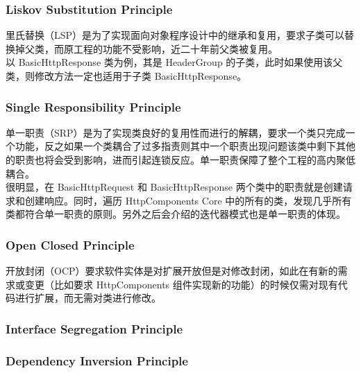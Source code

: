 \documentclass{article}
\begin{document}
	\subsubsection{Liskov Substitution Principle}
	\begin{CJK}{UTF8}{gbsn}
		\indent \indent 里氏替换（LSP）是为了实现面向对象程序设计中的继承和复用，要求子类可以替换掉父类，而原工程的功能不受影响，近二十年前父类被复用。\\
		\indent 以 BasicHttpResponse 类为例，其是 HeaderGroup 的子类，此时如果使用该父类，则修改方法一定也适用于子类 BasicHttpResponse。
	\end{CJK}{}

	\subsubsection{Single Responsibility Principle}
	\begin{CJK}{UTF8}{gbsn}
		\indent \indent 单一职责（SRP）是为了实现类良好的复用性而进行的解耦，要求一个类只完成一个功能，反之如果一个类耦合了过多指责则其中一个职责出现问题该类中剩下其他的职责也将会受到影响，进而引起连锁反应。单一职责保障了整个工程的高内聚低耦合。\\
		\indent 很明显，在 BasicHttpRequest 和 BasicHttpResponse 两个类中的职责就是创建请求和创建响应。同时，遍历 HttpComponents Core 中的所有的类，发现几乎所有类都符合单一职责的原则。另外之后会介绍的迭代器模式也是单一职责的体现。
	\end{CJK}{}

	\subsubsection{Open Closed Principle}
	\begin{CJK}{UTF8}{gbsn}
		\indent \indent 开放封闭（OCP）要求软件实体是对扩展开放但是对修改封闭，如此在有新的需求或变更（比如要求 HttpComponents 组件实现新的功能）的时候仅需对现有代码进行扩展，而无需对类进行修改。

	\end{CJK}{}

	\subsubsection{Interface Segregation Principle}
	\subsubsection{Dependency Inversion Principle}
\end{document}
